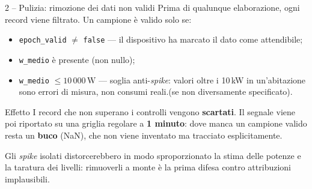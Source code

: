 \documentclass[aspectratio=169]{beamer}
\newcommand{\code}[1]{\texttt{\small #1}}
\newcommand{\unit}[1]{\,\mathrm{#1}}
\begin{document}
\begin{frame}{2 -- Pulizia: rimozione dei dati non validi}
  Prima di qualunque elaborazione, ogni record viene filtrato. Un campione \`e valido solo se:
  \vspace{0.4em}
  \begin{itemize}
    \item \code{epoch\_valid} $\neq$ \code{false} --- il dispositivo ha marcato il dato come attendibile;
    \item \code{w\_medio} \`e presente (non nullo);
    \item \code{w\_medio} $\le 10\,000\unit{W}$ --- soglia anti-\emph{spike}: valori oltre i 10\,kW
          in un'abitazione sono errori di misura, non consumi reali.(se non diversamente specificato).
  \end{itemize}

  \vspace{0.6em}
  \begin{block}{Effetto}
    \small
    I record che non superano i controlli vengono \textbf{scartati}. Il segnale viene poi riportato
    su una griglia regolare a \textbf{1 minuto}: dove manca un campione valido resta un \textbf{buco}
    (NaN), che non viene inventato ma tracciato esplicitamente.
  \end{block}

  \vspace{0.3em}
  \small\color{CorpGray}
  Gli \emph{spike} isolati distorcerebbero in modo sproporzionato la stima delle potenze e la
  taratura dei livelli: rimuoverli a monte \`e la prima difesa contro attribuzioni implausibili.
\end{frame}
\end{document}
